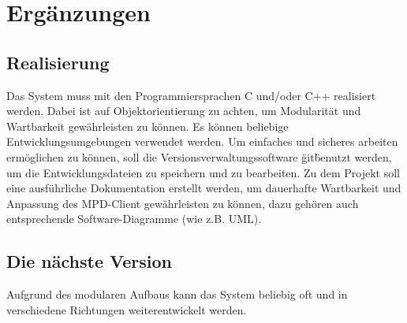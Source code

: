 \chapter{Ergänzungen}
\section{Realisierung}
Das System muss mit den Programmiersprachen C und/oder C++ realisiert werden. Dabei ist auf
Objektorientierung zu achten, um Modularität und Wartbarkeit gewährleisten zu können.
Es können beliebige Entwicklungsumgebungen verwendet werden. Um einfaches und sicheres arbeiten
ermöglichen zu können, soll die Versionsverwaltungssoftware \"git\" benutzt werden, um die
Entwicklungsdateien zu speichern und zu bearbeiten. Zu dem Projekt soll eine ausführliche
Dokumentation erstellt werden, um dauerhafte Wartbarkeit und Anpassung des MPD-Client  gewährleisten
zu können, dazu gehören auch entsprechende Software-Diagramme (wie z.B. UML).
\section{Die nächste Version}
Aufgrund des modularen Aufbaus kann das System beliebig oft und in verschiedene Richtungen weiterentwickelt werden.
